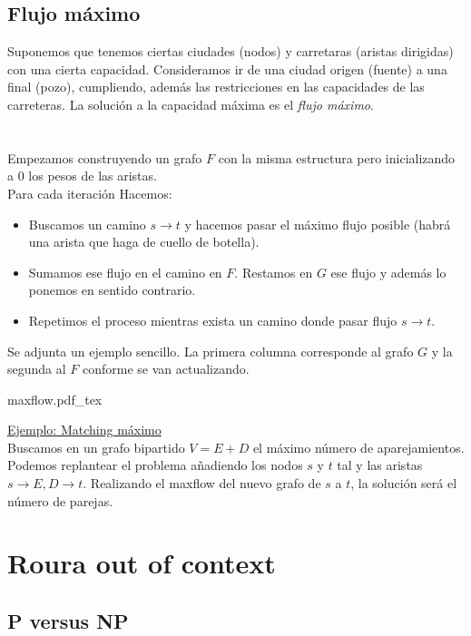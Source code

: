 \documentclass{myclass}
\newcommand{\incfig}[1]{%
  \begin{center}
  \def\svgwidth{0.9\columnwidth}
  {#1.pdf_tex}
  \end{center}
}
\newcommand{\algo}[2]{\boxed{\textbf{Algoritmo: }\textit{#1} \quad \mathcal{O}(#2)}}
\newcommand{\ex}[1]{\underline{Ejemplo:  #1}}
\begin{document}
\subsection{Flujo máximo}
Suponemos que tenemos ciertas ciudades (nodos) y carretaras (aristas dirigidas) con una cierta capacidad. Consideramos ir de una ciudad origen (fuente) a una final (pozo), cumpliendo, además las restricciones en las capacidades de las carreteras. La solución a la capacidad máxima es el \textit{flujo máximo}. \\
\\
\algo{Flujo máximo}{}\\
Empezamos construyendo un grafo $F$ con la misma estructura pero inicializando a $0$ los pesos de las aristas.\\
Para cada iteración Hacemos:
\begin{itemize}
  \item Buscamos un camino $s\to t$ y hacemos pasar el máximo flujo posible (habrá una arista que haga de cuello de botella).
  \item Sumamos ese flujo en el camino en $F$. Restamos en $G$ ese flujo y además lo ponemos en sentido contrario.
  \item Repetimos el proceso mientras exista un camino donde pasar flujo $s\to t$.
\end{itemize}
\noindent
Se adjunta un ejemplo sencillo. La primera columna corresponde al grafo $G$ y la segunda al  $F$ conforme se van actualizando.
\incfig{maxflow}
\ex{Matching máximo}\\
Buscamos en un grafo bipartido $V = E + D$ el máximo número de aparejamientos.\\
Podemos replantear el problema añadiendo los nodos $s$ y $t$ tal y las aristas $s \to E, D\to t$. Realizando el maxflow del nuevo grafo de $s$ a $t$, la solución será el número de parejas.



\section{Roura out of context}
\subsection{P versus NP}
\end{document}
